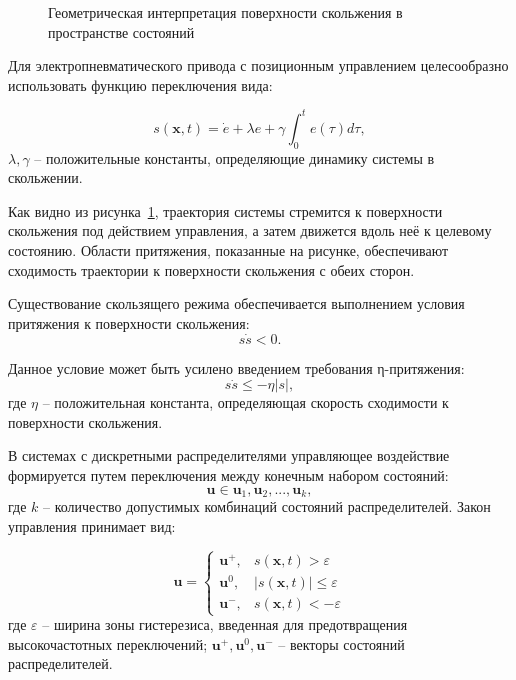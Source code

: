 \begin{figure}[ht]
	\caption{Геометрическая интерпретация поверхности скольжения в пространстве состояний}
	\label{fig:phase_plane}
\end{figure}

Для электропневматического привода с позиционным управлением целесообразно использовать функцию переключения вида:

\begin{equation*}
	s(\mathbf{x}, t) = \dot{e} + \lambda e + \gamma\int_{0}^{t}e(\tau)d\tau,
\end{equation*}
$\lambda, \gamma$ -- положительные константы, определяющие динамику системы в скольжении.

Как видно из рисунка~\ref{fig:phase_plane}, траектория системы стремится к поверхности скольжения под действием управления,
а затем движется вдоль неё к целевому состоянию. Области притяжения, показанные на рисунке,
обеспечивают сходимость траектории к поверхности скольжения с обеих сторон.

Существование скользящего режима обеспечивается выполнением условия притяжения к поверхности скольжения:
\begin{equation*}
	s\dot{s} < 0.
\end{equation*}

Данное условие может быть усилено введением требования η-притяжения:
\begin{equation*}
	s\dot{s} \leq -\eta|s|,
\end{equation*}
где $\eta$ -- положительная константа, определяющая скорость сходимости к поверхности скольжения.

В системах с дискретными распределителями управляющее воздействие формируется путем переключения между конечным набором состояний:
\begin{equation*}
	\mathbf{u} \in {\mathbf{u}_1, \mathbf{u}_2, ..., \mathbf{u}_k},
\end{equation*}
где $k$ -- количество допустимых комбинаций состояний распределителей. Закон управления принимает вид:

\begin{equation*}
	\mathbf{u} = \begin{cases}
		\mathbf{u}^+, & s(\mathbf{x}, t) > \varepsilon      \\
		\mathbf{u}^0, & |s(\mathbf{x}, t)| \leq \varepsilon \\
		\mathbf{u}^-, & s(\mathbf{x}, t) < -\varepsilon
	\end{cases}
\end{equation*}
где $\varepsilon$ -- ширина зоны гистерезиса, введенная для предотвращения высокочастотных переключений;
$\mathbf{u}^+, \mathbf{u}^0, \mathbf{u}^-$ -- векторы состояний распределителей.

